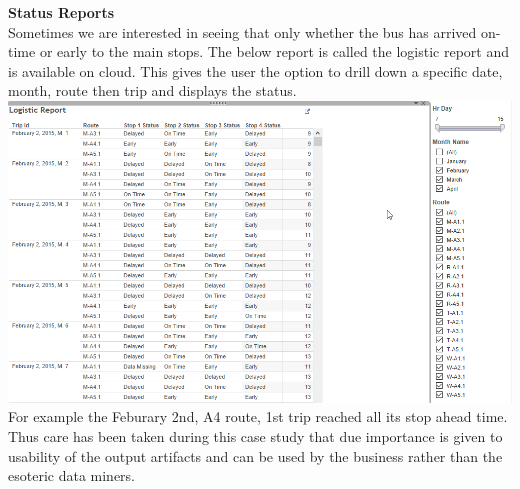 \documentclass[12pt]{article}\usepackage[]{graphicx}\usepackage[]{color}
\begin{document}
\textbf{Status Reports}\\
Sometimes we are interested in seeing that only whether the bus has arrived on-time or early to the main stops. The below report is called the logistic report and is available on cloud. This gives the user the option to drill down a specific date, month, route then trip and displays the status.\\
\includegraphics[scale=0.5]{resources/tableau6}\\[1cm] 
For example the Feburary 2nd, A4 route, 1st trip reached all its stop ahead time.\\
Thus care has been taken during this case study that due importance is given to usability of the output artifacts and can be used by the business rather than the esoteric data miners.
\end{document}

